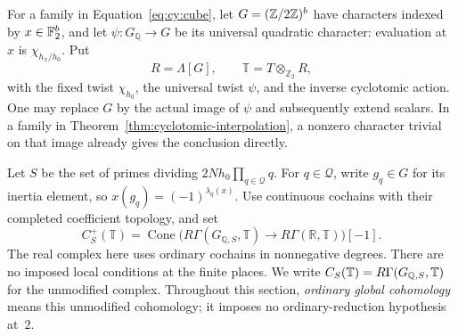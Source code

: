 For a family in Equation~\eqref{eq:cy:cube}, let
$G=(\mathbb Z/2\mathbb Z)^b$ have characters indexed by $x\in\mathbb F_2^b$, and let
$\psi:G_{\mathbb Q}\to G$ be its universal
quadratic character: evaluation at $x$ is $\chi_{h_x/h_0}$.  Put
\[
 R=\Lambda[G],\qquad
 \mathbb T=T\otimes_{\mathbb Z _2}R,
\]
with the fixed twist $\chi_{h_0}$, the universal twist $\psi$, and the
inverse cyclotomic action.  One may replace $G$ by the actual image of
$\psi$ and subsequently extend scalars.  In a family in
Theorem~\ref{thm:cyclotomic-interpolation}, a nonzero character trivial on that image
already gives the conclusion directly.

Let $S$ be the set of primes dividing $2N h_0\prod_{q\in\mathcal Q}q$.
For $q\in\mathcal Q$, write $g_q\in G$ for its inertia element, so
$x(g_q)=(-1)^{\lambda_q(x)}$. Use continuous cochains with their completed
coefficient topology, and set
\begin{equation}\label{eq:cy:positive-complex}
 C_S^+(\mathbb T)=
 \operatorname{Cone}\bigl(R\Gamma(G_{\mathbb Q,S},\mathbb T)
              \longrightarrow R\Gamma(\mathbb R,\mathbb T)\bigr)[-1].
\end{equation}
The real complex here uses ordinary cochains in nonnegative degrees.
There are no imposed local conditions at the finite places. We write
$C_S(\mathbb T)=R\Gamma(G_{\mathbb Q,S},\mathbb T)$ for the unmodified complex.
Throughout this section, \emph{ordinary global cohomology} means this
unmodified cohomology; it imposes no ordinary-reduction hypothesis at~$2$.

